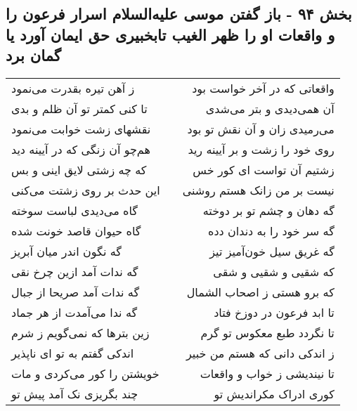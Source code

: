 \begin{center}
\section*{بخش ۹۴ - باز گفتن موسی علیه‌السلام اسرار فرعون را و واقعات او را ظهر الغیب تابخبیری حق ایمان آورد یا گمان برد}
\label{sec:sh094}
\begin{longtable}{l p{0.5cm} r}
ز آهن تیره بقدرت می‌نمود
&&
واقعاتی که در آخر خواست بود
\\
تا کنی کمتر تو آن ظلم و بدی
&&
آن همی‌دیدی و بتر می‌شدی
\\
نقشهای زشت خوابت می‌نمود
&&
می‌رمیدی زان و آن نقش تو بود
\\
هم‌چو آن زنگی که در آیینه دید
&&
روی خود را زشت و بر آیینه رید
\\
که چه زشتی لایق اینی و بس
&&
زشتیم آن تواست ای کور خس
\\
این حدث بر روی زشتت می‌کنی
&&
نیست بر من زانک هستم روشنی
\\
گاه می‌دیدی لباست سوخته
&&
گه دهان و چشم تو بر دوخته
\\
گاه حیوان قاصد خونت شده
&&
گه سر خود را به دندان دده
\\
گه نگون اندر میان آبریز
&&
گه غریق سیل خون‌آمیز تیز
\\
گه ندات آمد ازین چرخ نقی
&&
که شقیی و شقیی و شقی
\\
گه ندات آمد صریحا از جبال
&&
که برو هستی ز اصحاب الشمال
\\
گه ندا می‌آمدت از هر جماد
&&
تا ابد فرعون در دوزخ فتاد
\\
زین بترها که نمی‌گویم ز شرم
&&
تا نگردد طبع معکوس تو گرم
\\
اندکی گفتم به تو ای ناپذیر
&&
ز اندکی دانی که هستم من خبیر
\\
خویشتن را کور می‌کردی و مات
&&
تا نیندیشی ز خواب و واقعات
\\
چند بگریزی نک آمد پیش تو
&&
کوری ادراک مکراندیش تو
\\
\end{longtable}
\end{center}
